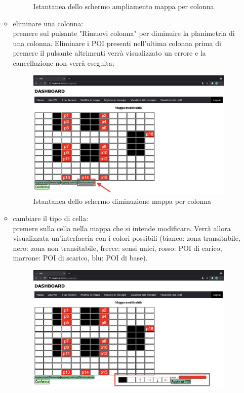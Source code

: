 \begin{itemize}
\begin{itemize}
\begin{figure}[H]
                \caption{Istantanea dello schermo ampliamento mappa per colonna}
            \end{figure}
            \item eliminare una colonna: \\premere sul pulsante "Rimuovi colonna" per diminuire la planimetria di una colonna. Eliminare i POI presenti nell'ultima colonna prima di premere il pulsante altrimenti verrà visualizzato un errore e la cancellazione non verrà eseguita;
            \begin{figure}[H]
                \centering
                \includegraphics[scale=0.12]{res/images/modificamappa4.png}
                \caption{Istantanea dello schermo diminuzione mappa per colonna}
            \end{figure}
            \item cambiare il tipo di cella: \\premere sulla cella nella mappa che si intende modificare. Verrà allora visualizzata un'interfaccia con i colori possibili (bianco: zona transitabile, nero: zona non transitabile, frecce: sensi unici, rosso: POI di carico, marrone: POI di scarico, blu: POI di base). 
            \begin{figure}[H]
                \centering
                \includegraphics[scale=0.12]{res/images/modificamappa5.png}

\end{figure}
\end{itemize}
\end{itemize}
